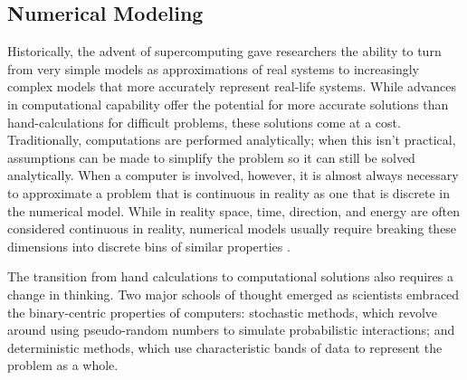 \subsection{Numerical Modeling}
Historically, the advent of supercomputing gave researchers the ability to turn from very simple models as approximations of real systems to increasingly complex models that more accurately represent real-life systems.  While advances in computational capability offer the potential for more accurate solutions than hand-calculations for difficult problems, these solutions come at a cost.  Traditionally, computations are performed analytically; when this isn't practical, assumptions can be made to simplify the problem so it can still be solved analytically.  When a computer is involved, however, it is almost always necessary to approximate a problem that is continuous in reality as one that is discrete in the numerical model.  While in reality space, time, direction, and energy are often considered continuous in reality, numerical models usually require breaking these dimensions into discrete bins of similar properties \cite{lewis}.

The transition from hand calculations to computational solutions also requires a change in thinking.  Two major schools of thought emerged as scientists embraced the binary-centric properties of computers: stochastic methods, which revolve around using pseudo-random numbers to simulate probabilistic interactions; and deterministic methods, which use characteristic bands of data to represent the problem as a whole.

